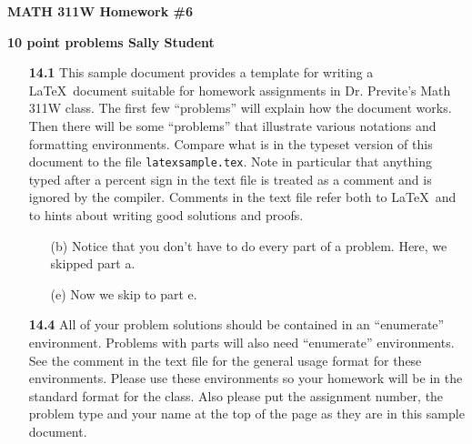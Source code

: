 \documentclass[12pt]{article}
\begin{document}
\centerline{\Large \bf MATH 311W Homework \#6}
\vspace{\baselineskip}
{\large \bf 10 point problems \hfill Sally Student}
\vspace{\baselineskip}

\begin{enumerate}
\item[{\bf \large 14.1}] %
This sample document provides a template for writing a \LaTeX\
document suitable for homework assignments in Dr. Previte's Math
311W class. The first few ``problems'' will explain how the
document works. Then there will be some ``problems'' that
illustrate various notations and formatting environments.  Compare
what is in the typeset version of this document to the file
\verb|latexsample.tex|.  Note in particular that anything typed
after a percent sign in the text file is treated as a comment and
is ignored by the compiler. Comments in the text file refer both
to \LaTeX\ and to hints about writing good solutions and proofs.
\begin{enumerate}
\item[(b)] %
Notice that you don't have to do every part of a problem.  Here, we skipped part a.

\item[(e)]
Now we skip to part e.

\end{enumerate}


\item[{\bf \large 14.4}]
All of your problem solutions should be contained in an
``enumerate'' environment.  Problems with parts will also need
``enumerate'' environments.  See the
comment in the text file for the general usage format for these
environments. Please use these environments so your homework will
be in the standard format for the class.  Also please put the
assignment number, the problem type and your name at the top of
the page as they are in this sample document.



\end{enumerate}
\end{document}

